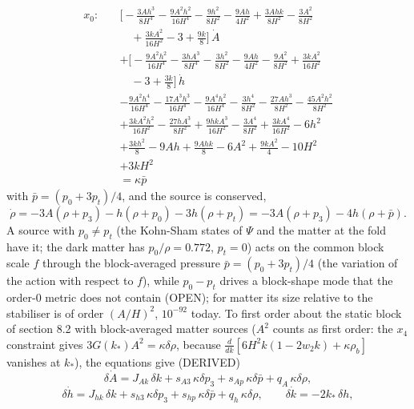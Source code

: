 \documentclass[
  10pt,
]{article}
\begin{document}
\[ \begin{aligned} x_0:\quad &\Big[- \frac{3 A h^{3}}{8 H^{4}} - \frac{9 A^{2} h^{2}}{16 H^{4}} - \frac{9 h^{2}}{8 H^{2}} - \frac{9 A h}{4 H^{2}} + \frac{3 A h k}{8 H^{2}} - \frac{3 A^{2}}{8 H^{2}} \\
   &\quad + \frac{3 k A^{2}}{16 H^{2}} - 3 + \frac{9 k}{8}\Big]\,\dot A \\
   &+ \Big[- \frac{9 A^{2} h^{2}}{16 H^{4}} - \frac{3 h A^{3}}{8 H^{4}} - \frac{3 h^{2}}{8 H^{2}} - \frac{9 A h}{4 H^{2}} - \frac{9 A^{2}}{8 H^{2}} + \frac{3 k A^{2}}{16 H^{2}} \\
   &\quad -3 + \frac{3 k}{8}\Big]\,\dot h \\
   &- \frac{9 A^{2} h^{4}}{16 H^{4}} - \frac{17 A^{3} h^{3}}{16 H^{4}} - \frac{9 A^{4} h^{2}}{16 H^{4}} - \frac{3 h^{4}}{8 H^{2}} - \frac{27 A h^{3}}{8 H^{2}} - \frac{45 A^{2} h^{2}}{8 H^{2}} \\
   &+ \frac{3 k A^{2} h^{2}}{16 H^{2}} - \frac{27 h A^{3}}{8 H^{2}} + \frac{9 h k A^{3}}{16 H^{2}} - \frac{3 A^{4}}{8 H^{2}} + \frac{3 k A^{4}}{16 H^{2}} - 6 h^{2} \\
   &+ \frac{3 k h^{2}}{8} - 9 A h + \frac{9 A h k}{8} - 6 A^{2} + \frac{9 k A^{2}}{4} - 10 H^{2} \\
   &+ 3 k H^{2} \\
   &= \kappa\bar p \end{aligned} \] with \(\bar p = (p_0 + 3p_t)/4\),
and the source is conserved,
\[ \dot\rho = -3A(\rho + p_3) - h(\rho + p_0) - 3h(\rho + p_t) = -3A(\rho + p_3) - 4h(\rho + \bar p) .\]
A source with \(p_0 \ne p_t\) (the Kohn-Sham states of \(\Psi\) and the
matter at the fold have it; the dark matter has \(p_0/\rho = 0.772\),
\(p_t = 0\)) acts on the common block scale \(f\) through the
block-averaged pressure \(\bar p = (p_0 + 3p_t)/4\) (the variation of
the action with respect to \(f\)), while \(p_0 - p_t\) drives a
block-shape mode that the order-0 metric does not contain (OPEN); for
matter its size relative to the stabiliser is of order \((A/H)^2\),
\(10^{-92}\) today. To first order about the static block of section 8.2
with block-averaged matter sources (\(A^2\) counts as first order: the
\(x_4\) constraint gives \(3G(k_*)A^2 = \kappa\delta\rho\), because
\(\frac{d}{dk}[6H^2k(1 - 2w_2k) + \kappa\rho_b]\) vanishes at \(k_*\)),
the equations give (DERIVED)
\[ \delta\dot A = J_{Ak}\,\delta k + s_{A3}\,\kappa\delta p_3 + s_{Ap}\,\kappa\delta\bar p + q_A\,\kappa\delta\rho,\]
\[ \delta\dot h = J_{hk}\,\delta k + s_{h3}\,\kappa\delta p_3 + s_{hp}\,\kappa\delta\bar p + q_h\,\kappa\delta\rho,\qquad \delta\dot k = -2k_*\,\delta h ,\]
\end{document}
